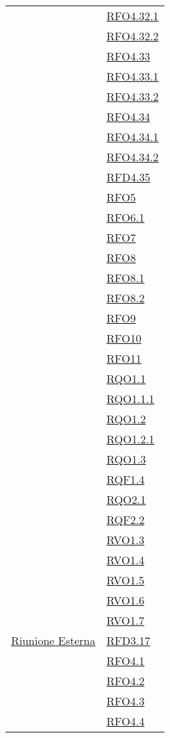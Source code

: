 \begin{longtable}{|>{\centering}m{5cm}|m{5cm}<{\centering}|}
& \hyperlink{RFO4.32.1}{RFO4.32.1}\\
& \hyperlink{RFO4.32.2}{RFO4.32.2}\\
& \hyperlink{RFO4.33}{RFO4.33}\\
& \hyperlink{RFO4.33.1}{RFO4.33.1}\\
& \hyperlink{RFO4.33.2}{RFO4.33.2}\\
& \hyperlink{RFO4.34}{RFO4.34}\\
& \hyperlink{RFO4.34.1}{RFO4.34.1}\\
& \hyperlink{RFO4.34.2}{RFO4.34.2}\\
& \hyperlink{RFD4.35}{RFD4.35}\\
& \hyperlink{RFO5}{RFO5}\\
& \hyperlink{RFO6.1}{RFO6.1}\\
& \hyperlink{RFO7}{RFO7}\\
& \hyperlink{RFO8}{RFO8}\\
& \hyperlink{RFO8.1}{RFO8.1}\\
& \hyperlink{RFO8.2}{RFO8.2}\\
& \hyperlink{RFO9}{RFO9}\\
& \hyperlink{RFO10}{RFO10}\\
& \hyperlink{RFO11}{RFO11}\\
& \hyperlink{RQO1.1}{RQO1.1}\\
& \hyperlink{RQO1.1.1}{RQO1.1.1}\\
& \hyperlink{RQO1.2}{RQO1.2}\\
& \hyperlink{RQO1.2.1}{RQO1.2.1}\\
& \hyperlink{RQO1.3}{RQO1.3}\\
& \hyperlink{RQF1.4}{RQF1.4}\\
& \hyperlink{RQO2.1}{RQO2.1}\\
& \hyperlink{RQF2.2}{RQF2.2}\\
& \hyperlink{RVO1.3}{RVO1.3}\\
& \hyperlink{RVO1.4}{RVO1.4}\\
& \hyperlink{RVO1.5}{RVO1.5}\\
& \hyperlink{RVO1.6}{RVO1.6}\\
& \hyperlink{RVO1.7}{RVO1.7}\\ \hline
\hyperlink{Riunione Esterna}{Riunione Esterna} 
& \hyperlink{RFD3.17}{RFD3.17}\\
& \hyperlink{RFO4.1}{RFO4.1}\\
& \hyperlink{RFO4.2}{RFO4.2}\\
& \hyperlink{RFO4.3}{RFO4.3}\\
& \hyperlink{RFO4.4}{RFO4.4}\\

\end{longtable}
